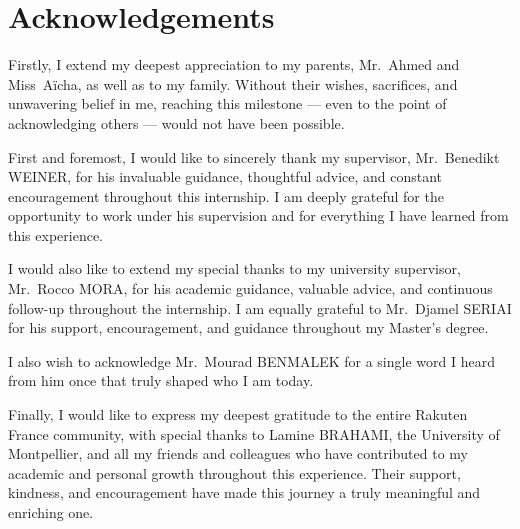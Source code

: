 \chapter*{Acknowledgements}


Firstly, I extend my deepest appreciation to my parents, Mr.~Ahmed and Miss~Aïcha, as well as to my family. Without their wishes, sacrifices, and unwavering belief in me, reaching this milestone --- even to the point of acknowledging others --- would not have been possible.

First and foremost, I would like to sincerely thank my supervisor, Mr.~Benedikt WEINER, for his invaluable guidance, thoughtful advice, and constant encouragement throughout this internship. I am deeply grateful for the opportunity to work under his supervision and for everything I have learned from this experience.

I would also like to extend my special thanks to my university supervisor, Mr.~Rocco MORA, for his academic guidance, valuable advice, and continuous follow-up throughout the internship. I am equally grateful to Mr.~Djamel SERIAI for his support, encouragement, and guidance throughout my Master's degree.

I also wish to acknowledge Mr.~Mourad BENMALEK for a single word I heard from him once that truly shaped who I am today.

Finally, I would like to express my deepest gratitude to the entire Rakuten France community, with special thanks to Lamine BRAHAMI, the University of Montpellier, and all my friends and colleagues who have contributed to my academic and personal growth throughout this experience. Their support, kindness, and encouragement have made this journey a truly meaningful and enriching one.